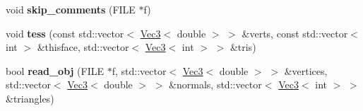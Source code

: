 \begin{DoxyCompactItemize}
\item 
\hypertarget{namespacehokusai_a429d9039b2bf90ad1ff24ec0e9593a7c}{void {\bfseries skip\+\_\+comments} (F\+I\+L\+E $\ast$f)}\label{namespacehokusai_a429d9039b2bf90ad1ff24ec0e9593a7c}

\item 
\hypertarget{namespacehokusai_a97153da3d1f4fe185af95c79d7ecf04f}{void {\bfseries tess} (const std\+::vector$<$ \hyperlink{classhokusai_1_1Vec3}{Vec3}$<$ double $>$ $>$ \&verts, const std\+::vector$<$ int $>$ \&thisface, std\+::vector$<$ \hyperlink{classhokusai_1_1Vec3}{Vec3}$<$ int $>$ $>$ \&tris)}\label{namespacehokusai_a97153da3d1f4fe185af95c79d7ecf04f}

\item 
\hypertarget{namespacehokusai_ae31f70496256a389a784ca58062c66ff}{bool {\bfseries read\+\_\+obj} (F\+I\+L\+E $\ast$f, std\+::vector$<$ \hyperlink{classhokusai_1_1Vec3}{Vec3}$<$ double $>$ $>$ \&vertices, std\+::vector$<$ \hyperlink{classhokusai_1_1Vec3}{Vec3}$<$ double $>$ $>$ \&normals, std\+::vector$<$ \hyperlink{classhokusai_1_1Vec3}{Vec3}$<$ int $>$ $>$ \&triangles)}\label{namespacehokusai_ae31f70496256a389a784ca58062c66ff}


\end{DoxyCompactItemize}
